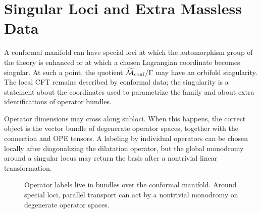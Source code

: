 \section{Singular Loci and Extra Massless Data}

A conformal manifold can have special loci at which the automorphism group of
the theory is enhanced or at which a chosen Lagrangian coordinate becomes
singular.  At such a point, the quotient
\(\widetilde{\mathcal M}_{\rm conf}/\Gamma\) may have an orbifold
singularity.  The local CFT remains described by conformal data; the
singularity is a statement about the coordinates used to parametrize the
family and about extra identifications of operator bundles.

Operator dimensions may cross along subloci.  When this happens, the correct
object is the vector bundle of degenerate operator spaces, together with the
connection and OPE tensors.  A labeling by individual operators can be chosen
locally after diagonalizing the dilatation operator, but the global
monodromy around a singular locus may return the basis after a nontrivial
linear transformation.

\begin{figure}[H]
  \centering
  \caption{Operator labels live in bundles over the conformal manifold.
  Around special loci, parallel transport can act by a nontrivial monodromy on
  degenerate operator spaces.}
  \label{fig:operator-bundle-monodromy}
\end{figure}

